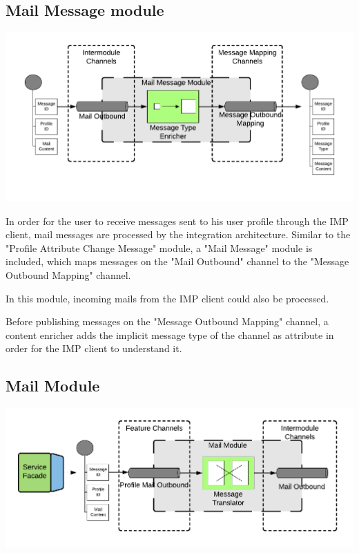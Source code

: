 \subsection{Mail Message module}

\begin{center}
    \includegraphics[scale=0.6]{Diagrams/Integration Architecture 1/Technological Integration/14. Mail Message Module.pdf}
\end{center}

In order for the user to receive messages sent to his user profile through the IMP client, mail messages are processed by the integration architecture. Similar to the "Profile Attribute Change Message" module, a "Mail Message" module is included, which maps messages on the "Mail Outbound" channel to the "Message Outbound Mapping" channel.

In this module, incoming mails from the IMP client could also be processed.

Before publishing messages on the "Message Outbound Mapping" channel, a content enricher adds the implicit message type of the channel as attribute in order for the IMP client to understand it. 

\subsection{Mail Module}

\begin{center}
    \includegraphics[scale=0.6]{Diagrams/Integration Architecture 1/Technological Integration/15. Mail Module.pdf}
\end{center}

